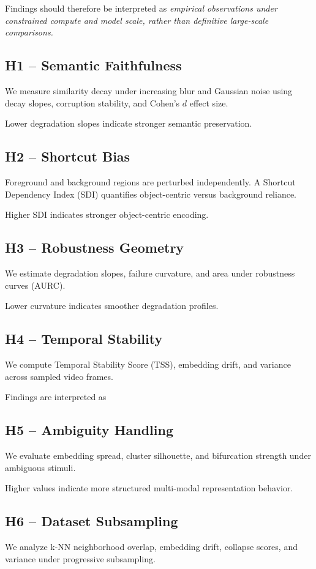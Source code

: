 \documentclass[10pt,twocolumn]{article}
\begin{document}
Findings should therefore be interpreted as \textit{empirical observations under constrained compute and model scale, rather than definitive large-scale comparisons.}


\subsection{H1 -- Semantic Faithfulness}
We measure similarity decay under increasing blur and Gaussian noise using decay slopes, corruption stability, and Cohen’s $d$ effect size.

Lower degradation slopes indicate stronger semantic preservation.

\subsection{H2 -- Shortcut Bias}
Foreground and background regions are perturbed independently. A Shortcut Dependency Index (SDI) quantifies object-centric versus background reliance.

Higher SDI indicates stronger object-centric encoding.

\subsection{H3 -- Robustness Geometry}
We estimate degradation slopes, failure curvature, and area under robustness curves (AURC).

Lower curvature indicates smoother degradation profiles.

\subsection{H4 -- Temporal Stability}
We compute Temporal Stability Score (TSS), embedding drift, and variance across sampled video frames.

Findings are interpreted as 

\subsection{H5 -- Ambiguity Handling}
We evaluate embedding spread, cluster silhouette, and bifurcation strength under ambiguous stimuli.

Higher values indicate more structured multi-modal representation behavior.

\subsection{H6 -- Dataset Subsampling}
We analyze k-NN neighborhood overlap, embedding drift, collapse scores, and variance under progressive subsampling.
\end{document}
